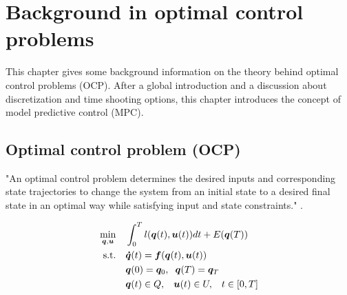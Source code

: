 \chapter{Background in optimal control problems}
\label{cha:OCP}

This chapter gives some background information on the theory behind optimal control problems (OCP). After a global introduction and a discussion about discretization and time shooting options, this chapter introduces the concept of model predictive control (MPC).

\section{Optimal control problem (OCP)}
\label{Optimal control problem (OCP)}
"An optimal control problem determines the desired inputs and corresponding state trajectories to change the system from an initial state to a desired final state in an optimal way while satisfying input and state constraints." \cite{Mercy2018}.

\begin{equation}
\label{eq:OCP}
\begin{aligned}
\min_{\bm{q},\bm{u}} \quad & \int_{0}^{T}l(\bm{q}(t),\bm{u}(t))dt + E(\bm{q}(T)) \\
\textrm{s.t.} \quad & \bm{\dot{q}}(t) = \bm{f}(\bm{q}(t), \bm{u}(t))\\
& \bm{q}(0)= \bm{q}_{0},\hspace{2 mm}\bm{q}(T)= \bm{q}_{T}    \\
& \bm{q}(t)\in Q,\hspace{3 mm} \bm{u}(t)\in U, \hspace{3 mm} t\in [0, T]
\end{aligned}
\end{equation}

